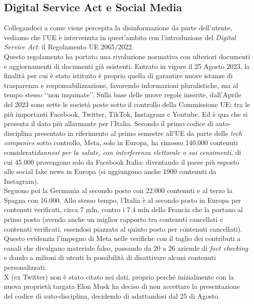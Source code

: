 \documentclass{article}
\begin{document}
\centering\newpage\subsection{Digital Service Act e Social Media}
\begin{justify}
    Collegandoci a come viene percepita la disinformazione da parte dell'utente, vediamo che l'UE è intervenuta in quest'ambito con l'introduzione del \textit{Digital Service Act}: il Regolamento UE 2065/2022.\\
    Questo regolamento ha portato una rivoluzione normativa con ulteriori documenti e aggiornamenti di documenti già esistenti.
    Entrato in vigore il 25 Agosto 2023, la finalità per cui è stato istituito è proprio quella di garantire nuove istanze di trasparenza e responsabilizzazione, favorendo informazioni pluralistiche, ma al tempo stesso ‘‘non inquinate’’.
    Sulla base delle nuove regole inserite, dall'Aprile del 2023 sono sette le società poste sotto il controllo della Commissione UE: tra le più importanti Facebook, Twitter, TikTok, Instagram e Youtube.\citep{dariano_disinformazione_2023}
    Ed è qua che si presenta il dato più allarmante per l'Italia. Secondo il primo codice di auto-disciplina presentato in riferimento al primo semestre all'UE da parte delle \textit{tech companies} sotto controllo, Meta, solo in Europa, ha rimosso 140.000 contenuti considerati\textit{dannosi per la salute, con interferenza elettorale o sui censimenti}, di cui 45.000 provengono solo da Facebook Italia: diventando il paese più esposto alle social fake news in Europa (si aggiungono anche 1900 contenuti da Instagram).\\
    Seguono poi la Germania al secondo posto con 22.000 contenuti e al terzo la Spagna con 16.000.
    Allo stesso tempo, l'Italia è al secondo posto in Europa per contenuti verificati, circa 7 mln, contro i 7.4 mln della Francia che la portano al primo posto (avendo anche un miglior rapporto tra contenuti cancellati e contenuti verificati, essendosi piazzata al quinto posto per contenuti cancellati).
    Questo evidenzia l'impegno di Meta nelle verifiche con il taglio dei contributi a canali che divulgano materiale falso, passando da 20 a 26 aziende di \textit{fact checking} e dando a milioni di utenti la possibilità di disattivare alcuni contenuti personalizzati.\citep{tg24_fake_2023}\\
    X (ex Twitter) non è stato citato nei dati, proprio perché inizialmente con la nuova proprietà targata Elon Musk ha deciso di non accettare la presentazione del codice di auto-disciplina, decidendo di adattandosi dal 25 di Agosto.\\

\end{justify}
\end{document}
